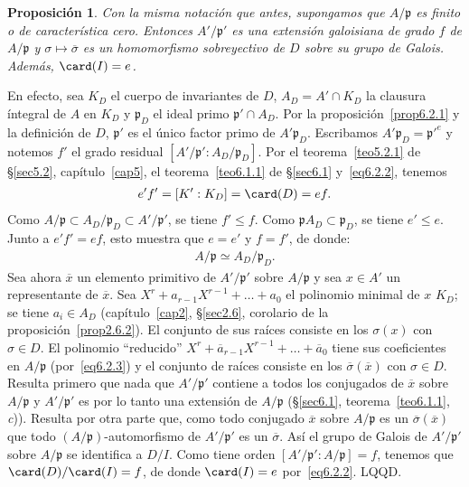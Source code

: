 \documentclass[bibtotoc,leqno,spanish]{amsbook}
\let\emph\relax %
\newcommand{\idl}[1]{\mathfrak{#1}}
\newcommand{\QED}{LQQD.}
\newcommand{\oline}[1]{\overline{#1}}
\numberwithin{equation}{section}
\theoremstyle{note}
\theoremstyle{note}
\newtheorem{proposition}{Proposici\'on}
\theoremstyle{rem}
\numberwithin{theorem}{section}
\numberwithin{proposition}{section}
\numberwithin{definition}{section}
\numberwithin{lemma}{section}
\numberwithin{corollary}{section}
\numberwithin{example}{section}
\numberwithin{footnote}{section}%
\begin{document}
\begin{proposition}\label{prop6.2.2}
Con la misma notaci\'on que antes, supongamos que $A/\idl{p}$ es finito o de caracter\'istica cero. Entonces
$A'/\idl{p}'$ es una extensi\'on galoisiana de grado $f$ de $A/\idl{p}$ y $\sigma\mapsto\oline\sigma$ es un
homomorfismo sobreyectivo de $D$ sobre su grupo de Galois. Adem\'as, $\card(I) = e$.
\end{proposition}

En efecto, sea $K_{D}$ el cuerpo de invariantes de $D$, $A_{D} = A'\cap K_{D}$ la clausura \'integral de
$A$ en $K_{D}$ y $\idl{p}_{D}$ el ideal primo $\idl{p}'\cap A_{D}$. Por la
proposici\'on~\ref{prop6.2.1} y la definici\'on
de $D$, $\idl{p}'$ es el \'unico factor primo de $A'\idl{p}_{D}$. Escribamos $A'\idl{p}_{D} = \idl{p}'^{e}$
y notemos $f'$ el grado residual $[A'/\idl{p}':A_{D}/\idl{p}_{D}]$. Por el teorema~\ref{teo5.2.1} de \S\ref{sec5.2},
cap\'itulo~\ref{cap5},
el teorema~\ref{teo6.1.1} de \S\ref{sec6.1} y~\eqref{eq6.2.2}, tenemos
\begin{gather*}
e'f'=[K':K_{D}]=\card(D)=ef.
\end{gather*}
Como $A/\idl{p}\subset A_{D}/\idl{p}_{D}\subset A'/\idl{p}'$, se tiene $f'\leq f$. Como $\idl{p}A_{D}\subset\idl{p}_{D}$,
se tiene $e'\leq e$. Junto a $e'f'=ef$, esto muestra que $e=e'$ y $f=f'$, de donde:
\begin{gather}\label{eq6.2.3}
A/\idl{p}\simeq A_{D}/\idl{p}_{D}.
\end{gather}
Sea ahora $\oline x$ un elemento primitivo de $A'/\idl{p}'$ sobre $A/\idl{p}$ y sea $x\in A'$ un
representante de $\oline x$. Sea $X^{r}+a_{r-1}X^{r-1}+\dots+a_{0}$ el polinomio minimal de $x$
\emph{sobre} $K_{D}$; se tiene $a_{i}\in A_{D}$ (cap\'itulo~\ref{cap2}, \S\ref{sec2.6},
corolario de la proposici\'on~\ref{prop2.6.2}).
El conjunto de sus ra\'ices consiste en los $\sigma(x)$ con $\sigma\in D$. El polinomio
``reducido'' $X^{r}+\oline a_{r-1}X^{r-1}+\dots+\oline a_{0}$ tiene sus coeficientes en $A/\idl{p}$
(por~\eqref{eq6.2.3}) y el conjunto de ra\'ices consiste en los $\oline\sigma(\oline x)$ con $\sigma\in D$. Resulta
primero que nada que $A'/\idl{p}'$ contiene a todos los conjugados de $\oline x$ sobre $A/\idl{p}$ y
$A'/\idl{p}'$ es por lo tanto una extensi\'on \emph{galoisiana} de $A/\idl{p}$
(\S\ref{sec6.1}, teorema~\ref{teo6.1.1}, {\itshape c})). Resulta por otra parte que, como todo conjugado $\oline x$ sobre $A/\idl{p}$
es un $\oline\sigma(\oline x)$ que todo $(A/\idl{p})$-automorfismo de $A'/\idl{p}'$ es un $\oline\sigma$.
As\'i el grupo de Galois de $A'/\idl{p}'$ sobre $A/\idl{p}$ se identifica a $D/I$. Como tiene orden
$[A'/\idl{p}':A/\idl{p}]=f$, tenemos que $\card(D)/\card(I) = f$, de donde $\card(I) = e$ por~\eqref{eq6.2.2}. \QED
\end{document}
